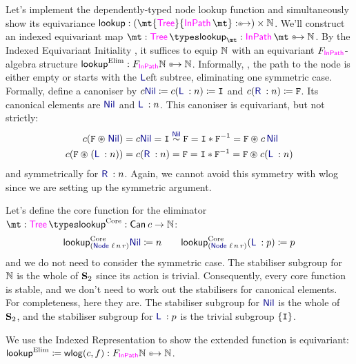 \begin{example}%
  Let's implement the dependently-typed node lookup function and
  simultaneously show its equivariance $\lookup :
  \DPair\mt{\Tree}{\NodeIn\mt} \equito \naturals$. We'll
  construct an indexed equivariant map $\mt : \Tree \types
  \lookup_{\mt} : \NodeIn\mt \equito \naturals$. By the Indexed
  Equivariant Initiality , it
  suffices to equip $\mathbb{N}$ with an equivariant
  $\struct[\NodeIn]$-algebra structure $\lookupElim : \struct[\NodeIn]
  \naturals \equito \naturals$. Informally, \WLOG{}, the path to the
  node is either empty or starts with the $\Lft$eft subtree,
  eliminating one symmetric case. Formally, define a
  canoniser by
  \(
  \canoniser\Nil \definedby \canoniser(\Lft\:: n) \definedby \stet
  \) and \(
  \canoniser(\Rgt\:: n) \definedby \swap
  \).
  Its canonical elements are $\Nil$ and $\Lft\::n$.
  This canoniser is equivariant, but not strictly:
  \begin{align*}
  \canoniser(\swap \act \Nil) &=
  \canoniser\Nil = \stet \stabeq{\Nil} \swap = \stet\mul\inv\swap =
  \swap\act \canoniser\,\Nil \\
  \canoniser(\swap \act (\Lft \:: n)) &=
  \canoniser(\Rgt \:: n) =
  \swap = \stet \mul \inv\swap = \swap\act\canoniser(\Lft\:: n)
  \end{align*}
  and symmetrically for $\Rgt \:: n$. Again, we cannot avoid this
  symmetry with wlog since we are setting up the symmetric argument.

  Let's define the core function for
  the eliminator $\mt : \Tree \types \lookupCore :
  \Canon\canoniser \to \naturals$:
  \[
  \lookupCore_{\parent{\Node\, \ell\,n\,  r}} \Nil \definedby n
  \qquad
  \lookupCore_{\parent{\Node\,\ell\,n\,  r}} (\Lft \:: p) \definedby p
  \]
  and we do not need to consider the symmetric case.
  The stabiliser subgroup for $\mathbb{N}$ is the whole of $\mathbf{S}_{2}$
  since its action is trivial. Consequently, every core function is
  stable, and we don't need to work out the stabilisers for canonical
  elements. For completeness, here they are.  The stabiliser subgroup
  for $\Nil$ is the whole of $\mathbf{S}_{2}$, and the stabiliser subgroup for
  $\Lft\::p$ is the trivial subgroup $\left\{\mathtt{I}\right\}$.

  We use the
  Indexed Representation  to
  show the extended function is equivariant: $\lookupElim \definedby
  \wlg(c,f) : \struct[\NodeIn]\naturals \equito \naturals$.
  \end{example}

